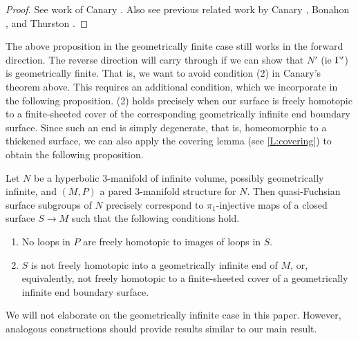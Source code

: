\begin{proof}

See work of Canary \cite{Canary}. Also see previous related work by Canary
\cite{Canary2}, Bonahon \cite{Bonahon}, and Thurston \cite{Thurstonnotes}.

\end{proof}

The above proposition in the geometrically finite case still works in the
forward direction. The reverse direction will carry through if we can show that
$N'$ (ie $\Gamma'$) is geometrically finite. That is, we want to avoid condition
(2) in Canary's theorem above. This requires an additional condition, which we
incorporate in the following proposition. (2) holds precisely when our surface
is freely homotopic to a finite-sheeted cover of the corresponding
geometrically infinite end boundary surface. Since such an end is simply
degenerate, that is, homeomorphic to a thickened surface, we can also apply the
covering lemma (see \ref{L:covering}) to obtain the following proposition.

\begin{prop}

Let $N$ be a hyperbolic $3$-manifold of infinite volume, possibly geometrically
infinite, and $(M,P)$ a pared $3$-manifold structure for $N$. Then
quasi-Fuchsian surface subgroups of $N$ precisely correspond to
$\pi_1$-injective maps of a closed surface $S \to M$ such that the following
conditions hold.

\begin{enumerate}

\item No loops in $P$ are freely homotopic to images of loops in $S$.

\item $S$ is not freely homotopic into a geometrically infinite end of $M$, or,
equivalently, not freely homotopic to a finite-sheeted cover of a geometrically
infinite end boundary surface.

\end{enumerate}

\end{prop}

We will not elaborate on the geometrically infinite case in this paper.
However, analogous constructions should provide results similar to our main
result.

